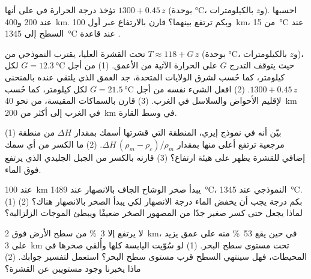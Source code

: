 \begin{exercise}[$\star\star$]\label{exo:g11:lithosphere-asthenosphere:11}
تؤخذ درجة الحرارة في  على أنها $1300 + 0.45\,z$ (بوحدة
\unit{\celsius}، و$z$ بالكيلومترات). احسبها عند 200 و\qty{400}{km}. وبكم
ترتفع بينهما؟ قارن بالارتفاع عبر
أول \qty{100}{km}، من \qty{15}{\celsius} عند السطح إلى
\qty{1345}{\celsius} عند قاعدة .
\end{exercise}

\begin{exercise}[$\star\star\star$]\label{exo:g11:lithosphere-asthenosphere:12}
تحت القشرة العليا، يقترب  النموذجي من $T \approx 118 +
G\,z$ (بوحدة \unit{\celsius}، و$z$ بالكيلومترات)، حيث يتوقف التدرج $G$
على الحرارة الآتية من الأعمق. (1) من أجل $G =
\qty{12.3}{\celsius}$ لكل كيلومتر، كما حُسب لشرق الولايات
المتحدة، جد العمق الذي يلتقي عنده بالمنحنى $1300 + 0.45\,z$. (2) افعل الشيء نفسه
من أجل $G = \qty{21.5}{\celsius}$ لكل كيلومتر، كما حُسب لإقليم الأحواض
والسلاسل في الغرب. (3) قارن بالسماكات المقيسة، من نحو
\qty{40}{km} في الغرب إلى أكثر من \qty{200}{km} في وسط
القارة.
\end{exercise}

\begin{exercise}[$\star\star\star$]\label{exo:g11:lithosphere-asthenosphere:13}
(1) بيّن أنه في نموذج إيري، المنطقة التي قشرتها أسمك بمقدار $\Delta H$
من منطقة مرجعية ترتفع أعلى منها بمقدار $\Delta H\,(\rho_m - \rho_c)/\rho_m$.
(2) ما الكسر من أي سمك إضافي للقشرة يظهر على هيئة ارتفاع؟ (3)
قارنه بالكسر من الجبل الجليدي الذي يرتفع فوق الماء.
\end{exercise}

\begin{exercise}[$\star\star\star$]\label{exo:g11:lithosphere-asthenosphere:14}
عند \qty{100}{km} يبدأ صخر الوشاح الجاف بالانصهار عند \qty{1489}{\celsius}،
 النموذجي عند \qty{1345}{\celsius}. (1) بكم درجة
يجب أن يخفض الماء درجة الانصهار لكي يبدأ الصخر
بالانصهار هناك؟ (2) لماذا يجعل حتى كسر صغير جدًا من المصهور
الصخر ضعيفًا ويبطئ الموجات الزلزالية؟
\end{exercise}

\begin{exercise}[$\star\star\star$]\label{exo:g11:lithosphere-asthenosphere:15}
لا يرتفع إلا \qty{3}{\percent} من سطح الأرض فوق \qty{2}{km}، في حين يقع
\qty{53}{\percent} منه على عمق يزيد على \qty{3}{km} تحت مستوى سطح البحر. (1) لو سُوّيت
اليابسة كلها وأُلقي صخرها في المحيطات، فهل سينتهي السطح
قرب مستوى سطح البحر؟ استعمل  لتفسير جوابك. (2) ماذا يخبرنا
وجود مستويين عن القشرة؟
\end{exercise}

